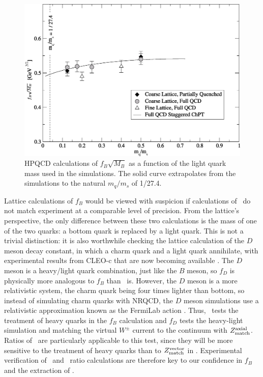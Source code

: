 \documentclass{cornell}
\begin{document}
\begin{figure}[p]
  \begin{center}
    \includegraphics[width=\linewidth]{fbresults}
  \end{center}
  \caption[Extrapolation of Lattice QCD results to physical light
  quark masses]{\label{fbresults} HPQCD calculations of $f_B \sqrt{M_B}$ as
  a function of the light quark mass used in the simulations.  The
  solid curve extrapolates from the simulations to the natural
  $m_q/m_s$ of 1/27.4.}
\end{figure}

Lattice calculations of $f_B$ would be viewed with suspicion if
calculations of \gee\ do not match experiment at a comparable level of
precision.  From the lattice's perspective, the only difference
between these two calculations is the mass of one of the two quarks: a
bottom quark is replaced by a light quark.  This is not a trivial
distinction: it is also worthwhile checking the lattice calculation of
the $D$ meson decay constant, in which a charm quark and a light quark
annihilate, with experimental results from CLEO-c that are now
becoming available \cite{fd}.  The $D$ meson is a heavy/light quark
combination, just like the $B$ meson, so $f_D$ is physically more
analogous to $f_B$ than \gee\ is.  However, the $D$ meson is a more
relativistic system, the charm quark being four times lighter than
bottom, so instead of simulating charm quarks with NRQCD, the $D$
meson simulations use a relativistic approximation known as the
FermiLab action \cite{confronts}.  Thus, \gee\ tests the treatment of
heavy quarks in the $f_B$ calculation and $f_D$ tests the heavy-light
simulation and matching the virtual $W^\pm$ current to the continuum
with $Z_{\mbox{\scriptsize match}}^{\mbox{\scriptsize axial}}$.  Ratios of \gee\ are
particularly applicable to this test, since they will be more
sensitive to the treatment of heavy quarks than to
$Z_{\mbox{\scriptsize match}}^{\mbox{\scriptsize vector}}$ in \gee.  Experimental verification of
\gee\ and \gee\ ratio calculations are therefore key to our confidence
in $f_B$ and the extraction of \vtd.
\end{document}
